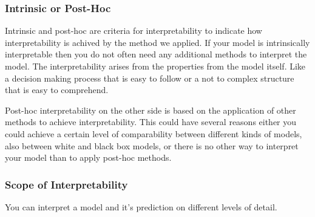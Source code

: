 \documentclass[11pt,
  a4paper,
  parskip=half, %
  BCOR=10mm, %
  english,
  ]{article}
\begin{document}
\subsubsection{Intrinsic or Post-Hoc}
Intrinsic and post-hoc are criteria for interpretability to indicate how interpretability is achived by the method we applied.
If your model is intrinsically interpretable then you do not often need any additional methods to interpret the model. 
The interpretability arises from the properties from the model itself. Like a decision making process that is easy to follow
or a not to complex structure that is easy to comprehend.\cite{molnar2022}

Post-hoc interpretability on the other side is based on the application of other methods to achieve interpretability. 
This could have several reasons either you could achieve a certain level of comparability between different kinds of models,
also between white and black box models, or there is no other way to interpret your model than to apply post-hoc methods. \cite{molnar2022}


\subsubsection{Scope of Interpretability}
You can interpret a model and it's prediction on different levels of detail. 
\end{document}
